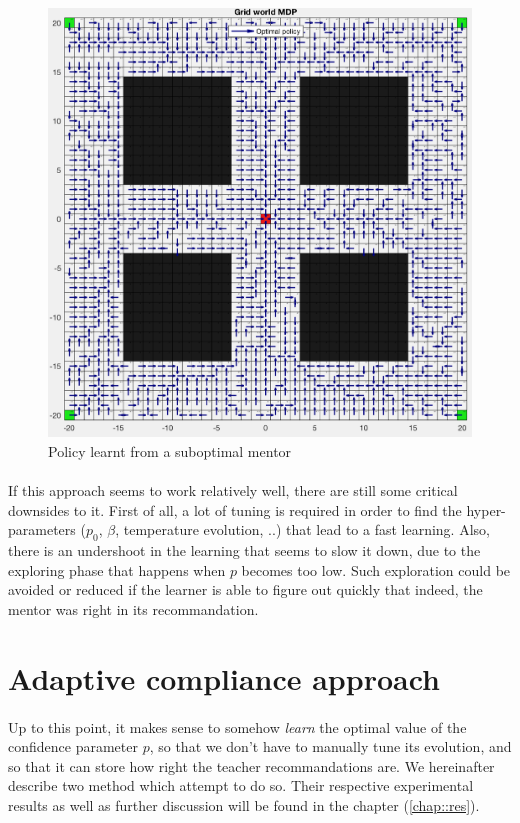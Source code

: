 \documentclass[a4paper]{report}
\begin{document}
{{{{			\begin{figure}[h!]
				\begin{center}
					\includegraphics[width=0.7\linewidth]{learnt_from_mentor}
					\caption{Policy learnt from a suboptimal mentor}
					\label{fig::learnt_from_mentor}
				\end{center}
			\end{figure}


		}		
		
		\paragraph{} If this approach seems to work relatively well, there are still some critical downsides to it. First of all, a lot of tuning is required in order to find the hyper-parameters ($p_0$, $\beta$, temperature evolution, ..) that lead to a fast learning. Also, there is an undershoot in the learning that seems to slow it down, due to the exploring phase that happens when $p$ becomes too low.  Such exploration could be avoided or reduced if the learner is able to figure out quickly that indeed, the mentor was right in its recommandation.
	}
	
	\section{Adaptive compliance approach}
	{	
	
		\paragraph{} Up to this point, it makes sense to somehow \emph{learn} the optimal value of the confidence parameter $p$, so that we don't have to manually tune its evolution, and so that it can store how right the teacher recommandations are. We hereinafter describe two method which attempt to do so. Their respective experimental results as well as further discussion will be found in the chapter (\ref{chap::res}).  
		
}}}
\end{document}
